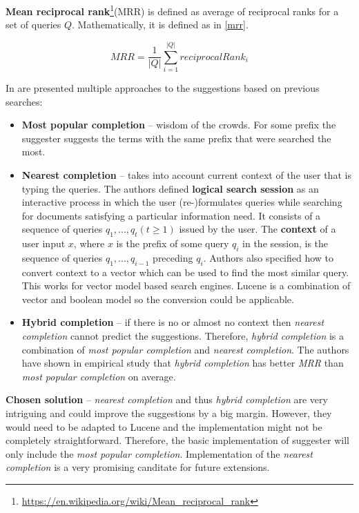 \textbf{Mean reciprocal rank}\footnote{\url{https://en.wikipedia.org/wiki/Mean\_reciprocal\_rank}}(MRR) is defined as
average of reciprocal ranks for a set of queries $Q$. Mathematically, it is defined as in \ref{mrr}.

\begin{equation}
\label{mrr}
MRR = \frac{1}{\vert Q \vert} \sum_{i=1}^{\vert Q \vert} reciprocalRank_i
\end{equation}

In \citep{Bar-yossef11context-sensitivequery} are presented multiple approaches to the suggestions based on previous
searches:
\begin{itemize}
    \item \textbf{Most popular completion} – wisdom of the crowds. For some prefix the suggester suggests the terms
    with the same prefix that were searched the most.
    \item \textbf{Nearest completion} – takes into account current context of the user that is typing the queries.
    The authors defined \textbf{logical search session} as an interactive process in which the user (re-)formulates queries
    while searching for documents satisfying a particular information need. It consists of a sequence of
    queries $q_1, . . . , q_t (t \geq 1)$ issued by the user. The \textbf{context} of a user input $x$, where $x$ is the prefix of
    some query $q_i$ in the session, is the sequence of queries $q_1, . . . , q_{i-1}$ preceding $q_i$.
    Authors also specified how to convert context to a vector which can be used to find the most similar query.
    This works for vector model based search engines. Lucene is a combination of vector and boolean model so the
    conversion could be applicable.

    \item \textbf{Hybrid completion} – if there is no or almost no context then \textit{nearest completion} cannot predict the
    suggestions. Therefore, \textit{hybrid completion} is a combination of \textit{most popular completion} and \textit{nearest completion}.
    The authors have shown in empirical study that \textit{hybrid completion} has better \textit{MRR} than
    \textit{most popular completion} on average.
\end{itemize}


\textbf{Chosen solution} – \textit{nearest completion} and thus \textit{hybrid completion} are very intriguing and could
improve the suggestions by a big margin. However, they would need to be adapted to Lucene and the implementation
might not be completely straightforward. Therefore, the basic implementation of suggester will only include the
\textit{most popular completion}. Implementation of the \textit{nearest completion} is a very promising canditate for
future extensions.

